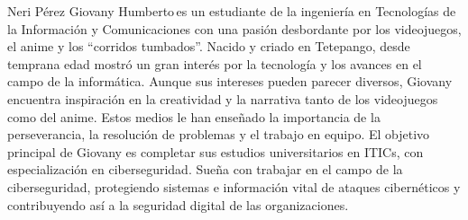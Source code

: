 \documentclass{IEEEcsmag}
\begin{document}
\begin{IEEEbiography}{Neri Pérez Giovany Humberto}{\,}es un estudiante de la ingeniería en Tecnologías de la Información y Comunicaciones con una pasión desbordante por los videojuegos, el anime y los ``corridos tumbados''. Nacido y criado en  Tetepango, desde temprana edad mostró un gran interés por la tecnología y los avances en el campo de la informática. Aunque sus intereses pueden parecer diversos, Giovany encuentra inspiración en la creatividad y la narrativa tanto de los videojuegos como del anime. Estos medios le han enseñado la importancia de la perseverancia, la resolución de problemas y el trabajo en equipo. El objetivo principal de Giovany es completar sus estudios universitarios en ITICs, con especialización en ciberseguridad. Sueña con trabajar en el campo de la ciberseguridad, protegiendo sistemas e información vital de ataques cibernéticos y contribuyendo así a la seguridad digital de las organizaciones.
\end{IEEEbiography}
\end{document}
